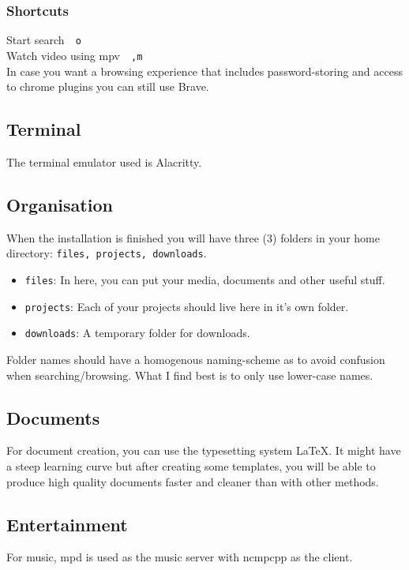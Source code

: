 \documentclass{article}
\let\src\texttt
\newcommand{\shortcut}[2]{#1~\dotfill{}~\src{#2}\\} %
\newcommand{\terminalemulator}{Alacritty}
\newcommand{\altbrowser}{Brave}
\newcommand{\videoplayer}{mpv}
\begin{document}
\subsubsection{Shortcuts}

\shortcut{Start search}{o}
\shortcut{Watch video using \videoplayer}{,m}

In case you want a browsing experience that includes password-storing 
and access to chrome plugins you can still use \altbrowser.

\subsection{Terminal}

The terminal emulator used is \terminalemulator. 

\subsection{Organisation}

When the installation is finished you will have three (3)
folders in your home directory: \src{files, projects, downloads}.

\begin{itemize}
    \item \src{files}: In here, you can put your media, documents and other useful stuff.
    \item \src{projects}: Each of your projects should live here in it's own folder.
    \item \src{downloads}: A temporary folder for downloads.
\end{itemize}

Folder names should have a homogenous naming-scheme as to avoid confusion when 
searching/browsing. What I find best is to only use lower-case names.

\subsection{Documents}

For document creation, you can use the typesetting system \LaTeX. 
It might have a steep learning curve but after creating some templates, 
you will be able to produce high quality documents faster and cleaner 
than with other methods.

\subsection{Entertainment}
For music, mpd is used as the music server with ncmpcpp
as the client. 
\end{document}
